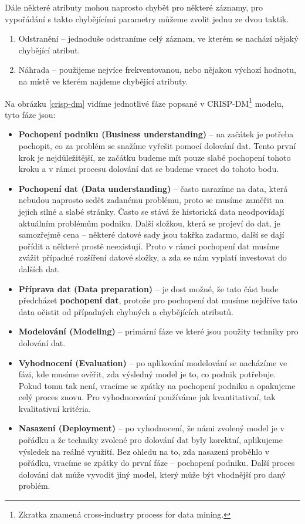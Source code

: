 \par Dále některé atributy mohou naprosto chybět pro některé záznamy, pro vypořádání s takto chybějícími parametry můžeme zvolit jednu ze dvou taktik. \cite{data-mining-principles}
\begin{enumerate}
\item Odstranění -- jednoduše odstraníme celý záznam, ve kterém se nachází nějaký chybějící atribut.
\item Náhrada -- použijeme nejvíce frekventovanou, nebo nějakou výchozí hodnotu, na místě ve kterém najdeme chybějící atributy. \cite{data-mining-principles}
\end{enumerate}

\par Na obrázku \ref{crisp-dm} vidíme jednotlivé fáze popsané v CRISP-DM\footnote{Zkratka znamená cross-industry process for data mining.} modelu, tyto fáze jsou:
\begin{itemize}
\item \textbf{Pochopení podniku (Business understanding)} -- na začátek je potřeba pochopit, co za problém se snažíme vyřešit pomocí dolování dat. Tento první krok je nejdůležitější, ze začátku budeme mít pouze slabé pochopení tohoto kroku a v rámci procesu dolování dat se budeme vracet do tohoto bodu. \cite{data-mining-practical}
\item \textbf{Pochopení dat (Data understanding)} -- často narazíme na data, která nebudou naprosto sedět zadanému problému, proto se musíme zaměřit na jejich silné a slabé stránky. Často se stává že historická data neodpovídají aktuálním problémům podniku. Další složkou, která se projeví do dat, je samozřejmě cena -- některé datové sady jsou takřka zadarmo, další se dají pořídit a některé prostě neexistují. Proto v rámci pochopení dat musíme zvážit případné rozšíření datové složky, a zda se nám vyplatí investovat do dalších dat. \cite{data-mining-practical}
\item \textbf{Příprava dat (Data preparation)} -- je dost možné, že tato část bude předcházet \textbf{pochopení dat}, protože pro pochopení dat musíme nejdříve tato data očistit od případných chybných a chybějících atributů. \cite{data-mining-practical}
\item \textbf{Modelování (Modeling)} -- primární fáze ve které jsou použity techniky pro dolování dat. \cite{data-mining-practical}
\item \textbf{Vyhodnocení (Evaluation)} -- po aplikování modelování se nacházíme ve fázi, kde musíme ověřit, zda výsledný model je to, co podnik potřebuje. Pokud tomu tak není, vracíme se zpátky na pochopení podniku a opakujeme celý proces znovu. Pro vyhodnocování používáme jak kvantitativní, tak kvalitativní kritéria. \cite{data-mining-practical}
\item \textbf{Nasazení (Deployment)} -- po vyhodnocení, že námi zvolený model je v pořádku a že techniky zvolené pro dolování dat byly korektní, aplikujeme výsledek na reálné využití. Bez ohledu na to, zda nasazení proběhlo v pořádku, vracíme se zpátky do první fáze -- pochopení podniku. Další proces dolování dat může vyvodit jiný model, který může být vhodnější pro daný problém. \cite{data-mining-practical}
\end{itemize}

